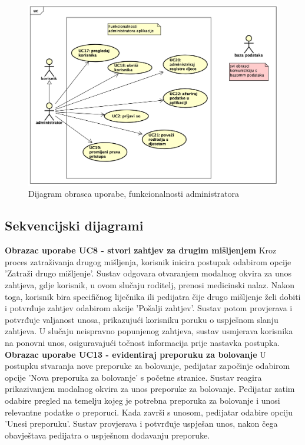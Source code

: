 					\begin{figure}[H]
						\includegraphics[width=\textwidth]{slike/uc_admin.png} 
						\caption{Dijagram obrasca uporabe, funkcionalnosti administratora}
						\label{fig:promjene2} 
					\end{figure}
				\eject		
				
			\subsection{Sekvencijski dijagrami}
				
				
				\noindent\textbf{Obrazac uporabe UC8 - stvori zahtjev za drugim mišljenjem}
				Kroz proces zatraživanja drugog mišljenja, korisnik inicira postupak odabirom opcije 
				'Zatraži drugo mišljenje'. Sustav odgovara otvaranjem modalnog okvira za unos zahtjeva, 
				gdje korisnik, u ovom slučaju roditelj, prenosi medicinski nalaz. Nakon toga, korisnik 
				bira specifičnog liječnika ili pedijatra čije drugo mišljenje želi dobiti i potvrđuje 
				zahtjev odabirom akcije 'Pošalji zahtjev'. Sustav potom provjerava i potvrđuje valjanost 
				unosa, prikazujući korisniku poruku o uspješnom slanju zahtjeva. U slučaju neispravno 
				popunjenog zahtjeva, sustav usmjerava korisnika na ponovni unos, osiguravajući točnost 
				informacija prije nastavka postupka. \\

				\noindent\textbf{Obrazac uporabe UC13 - evidentiraj preporuku za bolovanje}
				U postupku stvaranja nove preporuke za bolovanje, pedijatar započinje odabirom opcije 
				'Nova preporuka za bolovanje' s početne stranice. Sustav reagira prikazivanjem modalnog 
				okvira za unos preporuke za bolovanje. Pedijatar zatim odabire pregled na temelju kojeg 
				je potrebna preporuka za bolovanje i unosi relevantne podatke o preporuci. Kada završi 
				s unosom, pedijatar odabire opciju 'Unesi preporuku'. Sustav provjerava i potvrđuje 
				uspješan unos, nakon čega obavještava pedijatra o uspješnom dodavanju preporuke. \\

